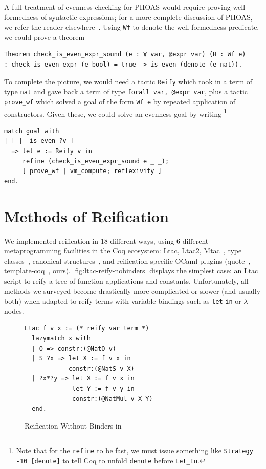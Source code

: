 A full treatment of evenness checking for PHOAS would require proving well-formedness of syntactic expressions; for a more complete discussion of PHOAS, we refer the reader elsewhere~\cite{PhoasICFP08}.
Using \texttt{Wf} to denote the well-formedness predicate, we could prove a theorem
\begin{verbatim}
Theorem check_is_even_expr_sound (e : ∀ var, @expr var) (H : Wf e)
: check_is_even_expr (e bool) = true -> is_even (denote (e nat)).
\end{verbatim}
To complete the picture, we would need a tactic \texttt{Reify} which took in a term of type \texttt{nat} and gave back a term of type \texttt{forall var, @expr var}, plus a tactic \texttt{prove\_wf} which solved a goal of the form \texttt{Wf e} by repeated application of constructors.
Given these, we could solve an evenness goal by writing%
\footnote{%
  Note that for the \texttt{refine} to be fast, we must issue something like \texttt{Strategy -10 [denote]} to tell Coq to unfold \texttt{denote} before \texttt{Let\_In}.
  }
\begin{verbatim}
match goal with
| [ |- is_even ?v ]
  => let e := Reify v in
     refine (check_is_even_expr_sound e _ _);
     [ prove_wf | vm_compute; reflexivity ]
end.
\end{verbatim}

\section{Methods of Reification} \label{sec:reif-survey}

We implemented reification in 18 different ways, using 6 different metaprogramming facilities in the Coq ecosystem: Ltac, Ltac2, Mtac~\cite{lessadhoc}, type classes~\cite{sozeau2008first}, canonical structures~\cite{gonthier2016small}, and reification-specific OCaml plugins (quote~\cite{quote-plugin}, template-coq~\cite{template-coq}, ours).
\autoref{fig:ltac-reify-nobinders} displays the simplest case: an Ltac script to reify a tree of function applications and constants.
Unfortunately, all methods we surveyed become drastically more complicated or slower (and usually both) when adapted to reify terms with variable bindings such as \texttt{let}-\texttt{in} or \texttt{$\lambda$} nodes.

\begin{figure}
\vspace{-11pt}
\begin{verbatim}
Ltac f v x := (* reify var term *)
  lazymatch x with
  | O => constr:(@NatO v)
  | S ?x => let X := f v x in
            constr:(@NatS v X)
  | ?x*?y => let X := f v x in
             let Y := f v y in
             constr:(@NatMul v X Y)
  end.
\end{verbatim}
\vspace{-20pt}
\caption{Reification Without Binders in \Ltac}\label{fig:ltac-reify-nobinders}
\end{figure}

